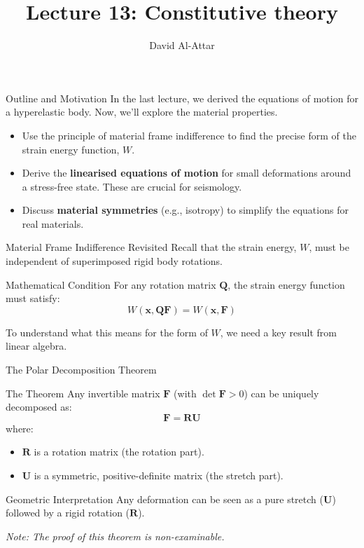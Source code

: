 \documentclass{beamer}
\title[Lecture 13: Constitutive theory]{Lecture 13: Constitutive theory}
\author{David Al-Attar}
\institute{Michaelmas term 2024}
\date{}
\begin{document}

\begin{frame}
    \titlepage
\end{frame}

\begin{frame}{Outline and Motivation}
    In the last lecture, we derived the equations of motion for a hyperelastic body. Now, we'll explore the material properties.
    \pause
    \begin{itemize}
        \item Use the principle of material frame indifference to find the precise form of the strain energy function, $W$.
        \pause
        \item Derive the \textbf{linearised equations of motion} for small deformations around a stress-free state. These are crucial for seismology.
        \pause
        \item Discuss \textbf{material symmetries} (e.g., isotropy) to simplify the equations for real materials.
    \end{itemize}
\end{frame}


\begin{frame}{Material Frame Indifference Revisited}
    Recall that the strain energy, $W$, must be independent of superimposed rigid body rotations.
    \begin{alertblock}{Mathematical Condition}
        For any rotation matrix $\mathbf{Q}$, the strain energy function must satisfy:
        $$ W(\mathbf{x}, \mathbf{Q}\mathbf{F}) = W(\mathbf{x}, \mathbf{F}) $$
    \end{alertblock}
    \pause
    To understand what this means for the form of $W$, we need a key result from linear algebra.
\end{frame}

\begin{frame}{The Polar Decomposition Theorem}
    \begin{block}{The Theorem}
        Any invertible matrix $\mathbf{F}$ (with $\det \mathbf{F} > 0$) can be uniquely decomposed as:
        $$ \mathbf{F} = \mathbf{R}\mathbf{U} $$
        where:
        \begin{itemize}
            \item $\mathbf{R}$ is a rotation matrix (the rotation part).
            \item $\mathbf{U}$ is a symmetric, positive-definite matrix (the stretch part).
        \end{itemize}
    \end{block}
    \pause
    \begin{exampleblock}{Geometric Interpretation}
        Any deformation can be seen as a pure stretch ($\mathbf{U}$) followed by a rigid rotation ($\mathbf{R}$).
    \end{exampleblock}
    \small\textit{Note: The proof of this theorem is non-examinable.}
\end{frame}
\end{document}
